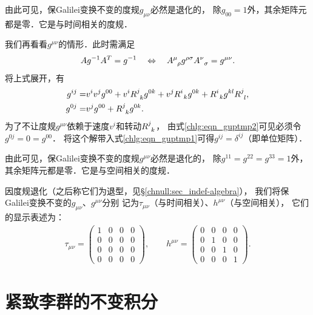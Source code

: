 由此可见，保Galilei变换不变的度规$g_{\mu\nu}$必然是退化的，
除$g_{00}=1$外，其余矩阵元都是零．它是与时间相关的度规．

我们再看看$g^{\mu\nu}$的情形．此时需满足
\begin{equation}
	A g^{-1} A^T = g^{-1} \quad \Leftrightarrow \quad
	A^{\mu}_{\hphantom{\mu}\rho} g^{\rho\sigma} A^{\nu}_{\hphantom{\mu}\sigma} = g^{\mu\nu}.
\end{equation}
将上式展开，有
\begin{align}
    g^{i j}= & v^i v^j g^{00}+ v^{i} R^{j}_{\hphantom{j}k } g^{0 k} + v^{j} R^{i}_{\hphantom{j} k} g^{0 k}  
     +R^i_{\hphantom{j}k} g^{kl} R^j_{\hphantom{j}l} , \label{chlg:eqn_guptmp1} \\
	g^{0 j}= & v^j g^{00}+R^j_{\hphantom{j}k} g^{0 k} . \label{chlg:eqn_guptmp2}  
\end{align}
为了不让度规$g^{\mu\nu}$依赖于速度$v^i$和转动$R^j_{\hphantom{j}k}$，
由式\eqref{chlg:eqn_guptmp2}可见必须令$g^{0j}=0=g^{00}$．
将这个解带入式\eqref{chlg:eqn_guptmp1}可得$g^{ij}=\delta^{ij}$（即单位矩阵）．

由此可见，保Galilei变换不变的度规$g^{\mu\nu}$必然是退化的，
除$g^{11}=g^{22}=g^{33}=1$外，其余矩阵元都是零．它是与空间相关的度规．

因度规退化（之后称它们为{\kaishu 退型}，见\S\ref{chnull:sec_indef-algebra}），
我们将保Galilei变换不变的$g_{\mu\nu}$、$g^{\mu\nu}$分别
记为$\tau_{\mu\nu}$（与时间相关）、$h^{\mu\nu}$（与空间相关），
它们的显示表述为：
\begin{align}
\tau_{\mu \nu}=\left(\begin{array}{cccc}
	1 & 0 & 0 & 0 \\
	0 & 0 & 0 & 0 \\
	0 & 0 & 0 & 0 \\
	0 & 0 & 0 & 0
\end{array}\right), \qquad 
h^{\mu \nu}=\left(\begin{array}{cccc}
	0 & 0 & 0 & 0 \\
	0 & 1 & 0 & 0 \\
	0 & 0 & 1 & 0 \\
	0 & 0 & 0 & 1
\end{array}\right) .	
\end{align}



\section{紧致李群的不变积分}\label{chlg:sec_Integral}


